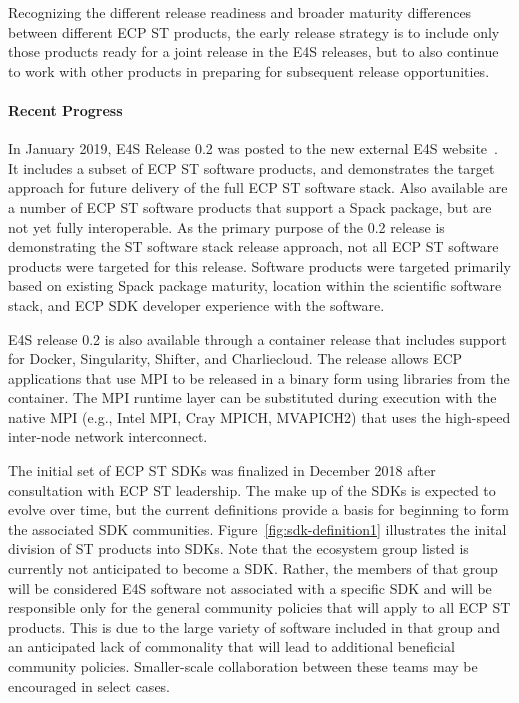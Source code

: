 Recognizing the different release readiness and broader maturity differences between different ECP ST products, the early release strategy is to include only those products ready for a joint release in the E4S releases, but to also continue to work with other products in preparing for subsequent release opportunities.

\paragraph{Recent Progress}
In January 2019, E4S Release 0.2 was posted to the new external E4S website~\cite{e4s:homepage}. It includes a subset of ECP ST software products, and demonstrates the target approach for future delivery of the full ECP ST software stack. Also available are a number of ECP ST software products that support a Spack package, but are not yet fully interoperable. As the primary purpose of the 0.2 release is demonstrating the ST software stack release approach, not all ECP ST software products were targeted for this release. Software products were targeted primarily based on existing Spack package maturity, location within the scientific software stack, and ECP SDK developer experience with the software.

E4S release 0.2 is also available through a container release that includes support for Docker, Singularity, Shifter, and Charliecloud. The release allows ECP applications that use MPI to be released in a binary form using libraries from the container. The MPI runtime layer can be substituted during execution with the native MPI (e.g., Intel MPI, Cray MPICH, MVAPICH2) that uses the high-speed inter-node network interconnect.

The initial set of ECP ST SDKs was finalized in December 2018 after consultation with ECP ST leadership. The make up of the SDKs is expected to evolve over time, but the current definitions provide a basis for beginning to form the associated SDK communities. Figure~\ref{fig:sdk-definition1} illustrates the inital division of ST products into SDKs. Note that the ecosystem group listed is currently not anticipated to become a SDK. Rather, the members of that group will be considered E4S software not associated with a specific SDK and will be responsible only for the general community policies that will apply to all ECP ST products. This is due to the large variety of software included in that group and an anticipated lack of commonality that will lead to additional beneficial community policies. Smaller-scale collaboration between these teams may be encouraged in select cases.

